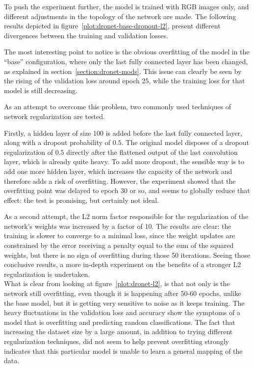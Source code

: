 To push the experiment further, the model is trained with RGB images only, and
different adjustments in the topology of the network are made. The following
results depicted in figure~\ref{plot:dronet-base-dropout-l2}, present different
divergences between the training and validation losses.



The most interesting point to notice is the obvious overfitting of the model
in the ``base'' configuration, where only the last fully connected layer has
been changed, as explained in section~\ref{section:dronet-mods}. This issue can
clearly be seen by the rising of the validation loss around epoch 25, while the
training loss for that model is still decreasing.

As an attempt to overcome this problem, two commonly used techniques of network
regularization are tested.

Firstly, a hidden layer of size 100 is added before the last fully connected
layer, along with a dropout probability of $0.5$. The original model disposes
of a dropout regularization of $0.5$ directly after the flattened output of the
last convolution layer, which is already quite heavy. To add more dropout, the
sensible way is to add one more hidden layer, which increases the capacity of
the network and therefore adds a risk of overfitting. However, the experiment
showed that the overfitting point was delayed to epoch 30 or so, and seems to
globally reduce that effect: the test is promising, but certainly not ideal.


As a second attempt, the L2 norm factor responsible for the regularization of
the network's weights was increased by a factor of 10. The results are clear:
the training is slower to converge to a minimal loss, since the weight updates
are constrained by the error receiving a penalty equal to the sum of the
squared weights, but there is no sign of overfitting during those 50
iterations. Seeing those conclusive results, a more in-depth experiment on the
benefits of a stronger L2 regularization is undertaken.\\



What is clear from looking at figure~\ref{plot:dronet-l2}, is that not only is
the network still overfitting, even though it is happening after 50-60 epochs,
unlike the base model, but it is getting very sensitive to noise as it keeps
training. The heavy fluctuations in the validation loss and accuracy show the
symptoms of a model that is overfitting and predicting random classifications.
The fact that increasing the dataset size by a large amount, in addition to
trying different regularization techniques, did not seem to help prevent
overfitting strongly indicates that this particular model is unable to learn a
general mapping of the data.\\

